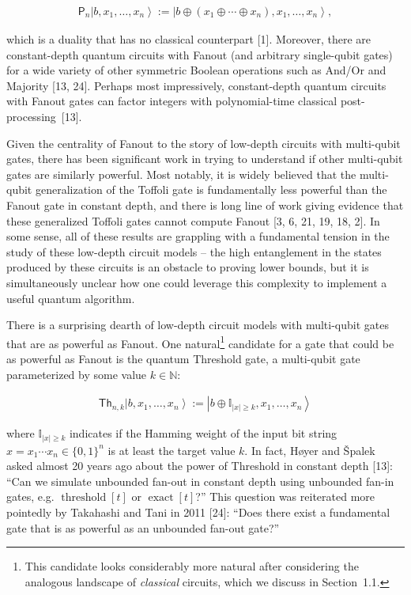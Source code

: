 \[\begin{gathered}
\mathsf{P}_{n}\left|b,x_{1},\ldots,x_{n}\right\rangle:=\left|b\oplus(x_{1}\oplus\cdots\oplus x_{n}),x_{1},\ldots,x_{n}\right\rangle,
\end{gathered}\]


which is a duality that has no classical counterpart [1]. Moreover, there are constant-depth quantum circuits with Fanout (and arbitrary single-qubit gates) for a wide variety of other symmetric Boolean operations such as And/Or and Majority [13, 24]. Perhaps most impressively, constant-depth quantum circuits with Fanout gates can factor integers with polynomial-time classical post-processing [13].\par




Given the centrality of Fanout to the story of low-depth circuits with multi-qubit gates, there has been significant work in trying to understand if other multi-qubit gates are similarly powerful. Most notably, it is widely believed that the multi-qubit generalization of the Toffoli gate is fundamentally less powerful than the Fanout gate in constant depth, and there is long line of work giving evidence that these generalized Toffoli gates cannot compute Fanout [3, 6, 21, 19, 18, 2]. In some sense, all of these results are grappling with a fundamental tension in the study of these low-depth circuit models – the high entanglement in the states produced by these circuits is an obstacle to proving lower bounds, but it is simultaneously unclear how one could leverage this complexity to implement a useful quantum algorithm.\par




There is a surprising dearth of low-depth circuit models with multi-qubit gates that are as powerful as Fanout. One natural\footnote{This candidate looks considerably more natural after considering the analogous landscape of \emph{classical} circuits, which we discuss in Section 1.1.} candidate for a gate that could be as powerful as Fanout is the quantum Threshold gate, a multi-qubit gate parameterized by some value $k\in\mathbb{N}$:\par


\[\begin{gathered}
\mathsf{Th}_{n,k}\left|b,x_{1},\ldots,x_{n}\right\rangle:=\left|b\oplus\mathbb{I}_{|x|\geq k},x_{1},\ldots,x_{n}\right\rangle
\end{gathered}\]


where $\mathbb{I}_{|x|\geq k}$ indicates if the Hamming weight of the input bit string $x=x_{1}\cdots x_{n}\in\{0,1\}^{n}$ is at least the target value $k$. In fact, Høyer and Špalek asked almost 20 years ago about the power of Threshold in constant depth [13]: “Can we simulate unbounded fan-out in constant depth using unbounded fan-in gates, e.g. $\operatorname{threshold}[t]$ or $\operatorname{exact}[t]$?” This question was reiterated more pointedly by Takahashi and Tani in 2011 [24]: “Does there exist a fundamental gate that is as powerful as an unbounded fan-out gate?”\par




